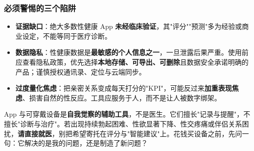 \subsubsection{必须警惕的三个陷阱}

\begin{itemize}
	\item \textbf{证据缺口}：绝大多数性健康 App \textbf{未经临床验证}，其"评分""预测"多为经验或商业设定，不能等同于医疗诊断。
	\item \textbf{数据隐私}：性健康数据是\textbf{最敏感的个人信息之一}，一旦泄露后果严重。使用前应查看隐私政策，优先选择\textbf{本地存储、可导出、可删除}且数据安全承诺明确的产品；谨慎授权通讯录、定位与云端同步。
	\item \textbf{过度量化焦虑}：把亲密关系变成每天打分的"KPI"，可能反过来\textbf{加重表现焦虑}、损害自然的性反应。工具应服务于人，而不是让人被数字绑架。
\end{itemize}

\begin{tcolorbox}[colback=blue!5!white,colframe=blue!50!black,title=贴心小叮咛]
App 与可穿戴设备是\textbf{自我觉察的辅助工具}，不是医生。它们擅长"记录与提醒"，不擅长"诊断与治疗"。若出现持续勃起困难、性欲显著下降、性交疼痛或伴侣关系困扰，\textbf{请直接就医}，别把希望寄托在评分与"智能建议"上。花钱买设备之前，先问一句：它解决的是我的问题，还是制造了新问题？
\end{tcolorbox}
